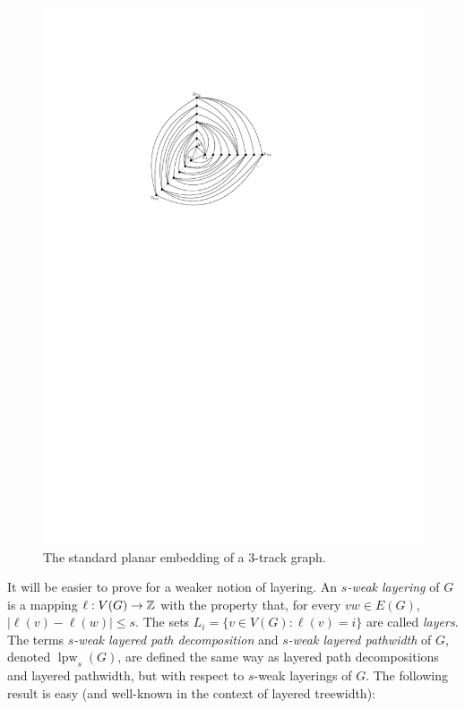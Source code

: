 \documentclass{patmorin}
\DeclareMathOperator{\lpw}{lpw}
\begin{document}
\begin{figure}
  \begin{center}
     \includegraphics{figs/graph-1}
  \end{center}
  \caption{The standard planar embedding of a 3-track graph.}
\end{figure}

It will be easier to prove  for a weaker notion
of layering.  An \emph{$s$-weak layering} of $G$ is a mapping
$\ell:V(G)\to\mathbb{Z}$ with the property that, for every $vw\in E(G)$,
$|\ell(v)-\ell(w)|\le s$.  The sets $L_i=\{v\in V(G): \ell(v)=i\}$
are called \emph{layers}.  The terms \emph{$s$-weak layered path
decomposition} and \emph{$s$-weak layered pathwidth} of $G$, denoted
$\lpw_s(G)$, are defined the same way as layered path decompositions
and layered pathwidth, but with respect to $s$-weak layerings of $G$. The following result is easy (and well-known in the context of layered treewidth):
\end{document}
